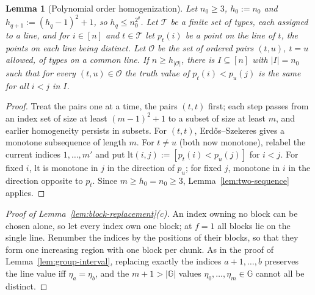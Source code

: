 \documentclass[11pt]{article}
\numberwithin{equation}{section}
\theoremstyle{plain}
\newtheorem{lemma}[theorem]{Lemma}
\theoremstyle{definition}
\theoremstyle{remark}
\theoremstyle{plain}
\begin{document}
\begin{lemma}[Polynomial order homogenization]
\label{lem:order-homogenize}
Let $n_0\ge3$, $h_0:=n_0$ and $h_{q+1}:=(h_q-1)^2+1$, so $h_q\le n_0^{2^q}$.  Let $\mathcal T$ be a
finite set of types, each assigned to a line, and for $i\in[n]$ and $t\in \mathcal T$ let
$p_t(i)$ be a point on the line of $t$, the points on each line being distinct.  Let
$\mathcal O$ be the set of ordered pairs $(t,u)$, $t=u$ allowed, of types on a common line.
If $n\ge h_{|\mathcal O|}$, there is $I\subseteq[n]$ with $|I|=n_0$ such that for
every $(t,u)\in\mathcal O$ the truth value of $p_t(i)<p_u(j)$ is the same for all $i<j$ in
$I$.
\end{lemma}

\begin{proof}
Treat the pairs one at a time, the pairs $(t,t)$ first; each step passes from an
index set of size at least $(m-1)^2+1$ to a subset of size at least $m$, and earlier
homogeneity persists in subsets.  For $(t,t)$, Erd\H{o}s--Szekeres gives a monotone
subsequence of length $m$.  For $t\ne u$ (both now monotone), relabel the current
indices $1,\ldots,m'$ and put $\mathrm{lt}(i,j):=[p_t(i)<p_u(j)]$ for $i<j$.  For fixed $i$,
$\mathrm{lt}$ is monotone in $j$ in the direction of $p_u$; for fixed $j$, monotone in $i$ in
the direction opposite to $p_t$.  Since $m\ge h_0=n_0\ge3$,
Lemma~\ref{lem:two-sequence} applies.
\end{proof}

\begin{proof}[Proof of Lemma~\ref{lem:block-replacement}\textup{(c)}]
An index owning no block can be chosen alone, so let every index own one block; at
$f=1$ all blocks lie on the single line.  Renumber the indices by the positions of
their blocks, so that they form one increasing region with one block per chunk.  As
in the proof of Lemma~\ref{lem:group-interval}, replacing exactly the indices
$a+1,\ldots,b$ preserves the line value iff $\eta_a=\eta_b$, and the $m+1>|{\mathbb G}|$
values $\eta_0,\ldots,\eta_m\in{\mathbb G}$ cannot all be distinct.
\end{proof}
\end{document}
